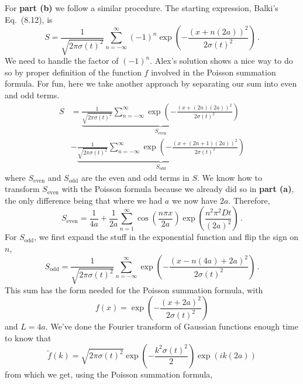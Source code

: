For \textbf{part (b)} we follow a similar procedure.
The starting expression, Balki's Eq.~(8.12), is
\begin{equation*}
  S = \frac{1}{\sqrt{2 \pi \sigma(t)^2}} \sum_{n=-\infty}^\infty
    (-1)^n \exp \left( - \frac{(x + n (2 a))^2}{2 \sigma(t)^2} \right)
  \, .
\end{equation*}
We need to handle the factor of $(-1)^n$.
Alex's solution shows a nice way to do so by proper definition of the function $f$ involved in the Poisson summation formula.
For fun, here we take another approach by separating our sum into even and odd terms.
\begin{align*}
  S
  &= \underbrace{\frac{1}{\sqrt{2\pi \sigma(t)^2}} \sum_{n=-\infty}^\infty
    \exp \left(- \frac{(x + (2n    )(2a))^2}{2 \sigma(t)^2} \right)}_{S_\text{even}} \\
  &- \underbrace{\frac{1}{\sqrt{2\pi \sigma(t)^2}} \sum_{n=-\infty}^\infty
    \exp \left(- \frac{(x + (2n + 1)(2a))^2}{2 \sigma(t)^2} \right)}_{S_\text{odd}}
\end{align*}
where $S_\text{even}$ and $S_\text{odd}$ are the even and odd terms in $S$.
We know how to transform $S_\text{even}$ with the Poisson formula because we already did so in \textbf{part (a)}, the only difference being that where we had $a$ we now have $2a$.
Therefore,
\begin{equation*}
  S_\text{even} = \frac{1}{4 a} + \frac{1}{2 a}\sum_{n=1}^\infty
    \cos \left( \frac{n \pi x}{2 a} \right)
    \exp \left( \frac{n^2 \pi^2 D t}{(2a)^2} \right)
  \, .
\end{equation*}
For $S_\text{odd}$, we first expand the stuff in the exponential function and flip the sign on $n$,
\begin{equation*}
  S_\text{odd}
  = \frac{1}{\sqrt{2 \pi \sigma(t)^2}}
    \sum_{n=-\infty}^\infty \exp \left(- \frac{(x - n(4a) + 2a)^2}{2 \sigma(t)^2} \right)
  \, .
\end{equation*}
This sum has the form needed for the Poisson summation formula, with
\begin{equation*}
  f(x) = \exp \left( - \frac{(x + 2 a)^2}{2 \sigma(t)^2} \right)
\end{equation*}
and $L = 4 a$.
We've done the Fourier transform of Gaussian functions enough time to know that
\begin{equation*}
  \tilde{f}(k) = \sqrt{2 \pi \sigma(t)^2}
    \exp \left( - \frac{k^2 \sigma(t)^2}{2} \right)
    \exp \left( i k (2a) \right)
\end{equation*}
from which we get, using the Poisson summation formula,
